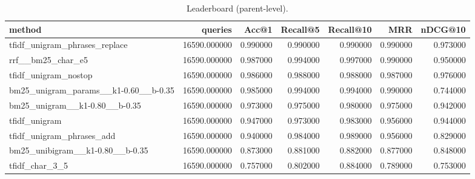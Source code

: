 \begin{table}
\caption{Leaderboard (parent-level).}
\label{tab:lb_parent}
\begin{tabular}{lrrrrrr}
\toprule
method & queries & Acc@1 & Recall@5 & Recall@10 & MRR & nDCG@10 \\
\midrule
tfidf_unigram_phrases_replace & 16590.000000 & 0.990000 & 0.990000 & 0.990000 & 0.990000 & 0.973000 \\
rrf__bm25_char_e5 & 16590.000000 & 0.987000 & 0.994000 & 0.997000 & 0.990000 & 0.950000 \\
tfidf_unigram_nostop & 16590.000000 & 0.986000 & 0.988000 & 0.988000 & 0.987000 & 0.976000 \\
bm25_unigram_params__k1-0.60__b-0.35 & 16590.000000 & 0.985000 & 0.994000 & 0.994000 & 0.990000 & 0.744000 \\
bm25_unigram__k1-0.80__b-0.35 & 16590.000000 & 0.973000 & 0.975000 & 0.980000 & 0.975000 & 0.942000 \\
tfidf_unigram & 16590.000000 & 0.947000 & 0.973000 & 0.983000 & 0.956000 & 0.944000 \\
tfidf_unigram_phrases_add & 16590.000000 & 0.940000 & 0.984000 & 0.989000 & 0.956000 & 0.829000 \\
bm25_unibigram__k1-0.80__b-0.35 & 16590.000000 & 0.873000 & 0.881000 & 0.882000 & 0.877000 & 0.848000 \\
tfidf_char_3_5 & 16590.000000 & 0.757000 & 0.802000 & 0.884000 & 0.789000 & 0.753000 \\
\bottomrule
\end{tabular}
\end{table}
